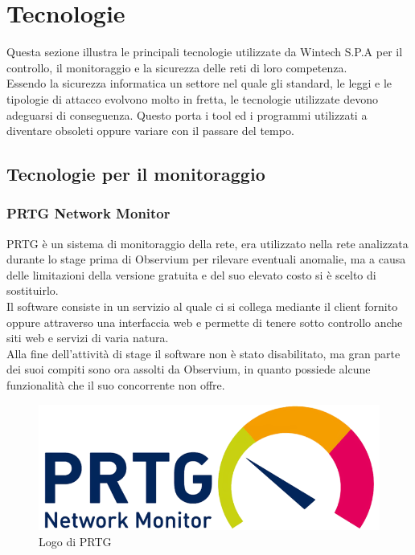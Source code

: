 \documentclass[Tesi.tex]{subfiles}
\begin{document}
\chapter{Tecnologie}

Questa sezione illustra le principali tecnologie utilizzate da Wintech S.P.A per il controllo, il monitoraggio e la sicurezza delle reti di loro competenza. \\
Essendo la sicurezza informatica un settore nel quale gli standard, le leggi e le tipologie di attacco evolvono molto in fretta, le tecnologie utilizzate devono adeguarsi di conseguenza. Questo porta i tool ed i programmi utilizzati a diventare obsoleti oppure variare con il passare del tempo.

\section{Tecnologie per il monitoraggio}
\subsection{PRTG Network Monitor}
PRTG è un sistema di monitoraggio della rete, era utilizzato nella rete analizzata durante lo stage prima di Observium per rilevare eventuali anomalie, ma a causa delle limitazioni della versione gratuita e del suo elevato costo si è scelto di sostituirlo.\\
Il software consiste in un servizio al quale ci si collega mediante il client fornito oppure attraverso una interfaccia web e permette di tenere sotto controllo anche siti web e servizi di varia natura. \\
Alla fine dell'attività di stage il software non è stato disabilitato, ma gran parte dei suoi compiti sono ora assolti da Observium, in quanto possiede alcune funzionalità che il suo concorrente non offre. \\
\begin{figure}[H]
	\centering
	\includegraphics[width=0.5\linewidth]{"images/logo/PRTG_logo"}
	\caption{Logo di PRTG}
	\label{fig:Logo di PRTG}
\end{figure}
\end{document}
